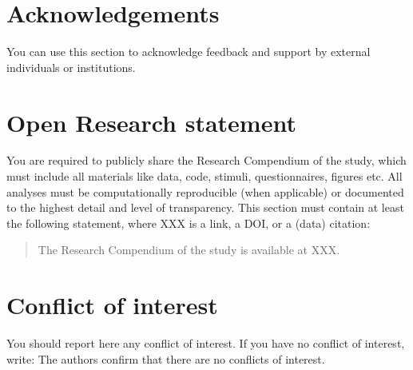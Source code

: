 \documentclass[
]{rrling}
\begin{document}
\section*{Acknowledgements}\label{acknowledgements}

You can use this section to acknowledge feedback and support by external
individuals or institutions.

\section*{Open Research statement}\label{open-research-statement}

You are required to publicly share the Research Compendium of the study,
which must include all materials like data, code, stimuli,
questionnaires, figures etc. All analyses must be computationally
reproducible (when applicable) or documented to the highest detail and
level of transparency. This section must contain at least the following
statement, where XXX is a link, a DOI, or a (data) citation:

\begin{quote}
The Research Compendium of the study is available at XXX.
\end{quote}

\section*{Conflict of interest}\label{conflict-of-interest}

You should report here any conflict of interest. If you have no conflict
of interest, write: The authors confirm that there are no conflicts of
interest.
\end{document}
